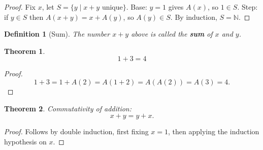\documentclass[12pt, a4paper, english]{book}
\numberwithin{figure}{section}
\numberwithin{equation}{section}
\theoremstyle{springerth}
\newtheorem{theorem}{Theorem}[section]
\theoremstyle{springerdef}
\newtheorem{definition}{Definition}[section]
\begin{document}
\begin{proof}
Fix $x$, let $S = \{ y \mid x+y \text{ unique}\}$. Base: $y=1$ gives $A(x)$, so $1\in S$. Step: if $y \in S$ then $A(x+y)=x+A(y)$, so $A(y)\in S$. By induction, $S=\mathbb{N}$.
\end{proof}

\begin{definition}[Sum]
The number $x+y$ above is called the \textbf{sum} of $x$ and $y$.
\end{definition}

\begin{theorem}
$$1+3=4$$
\end{theorem}

\begin{proof}
$$1+3 = 1+A(2) = A(1+2) = A(A(2)) = A(3) = 4.$$
\end{proof}

\begin{theorem}{Commutativity of addition:} $$x+y=y+x.$$
\end{theorem}

\begin{proof}
Follows by double induction, first fixing $x=1$, then applying the induction hypothesis on $x$.
\end{proof}

\begin{center}
\end{center}
\end{document}
